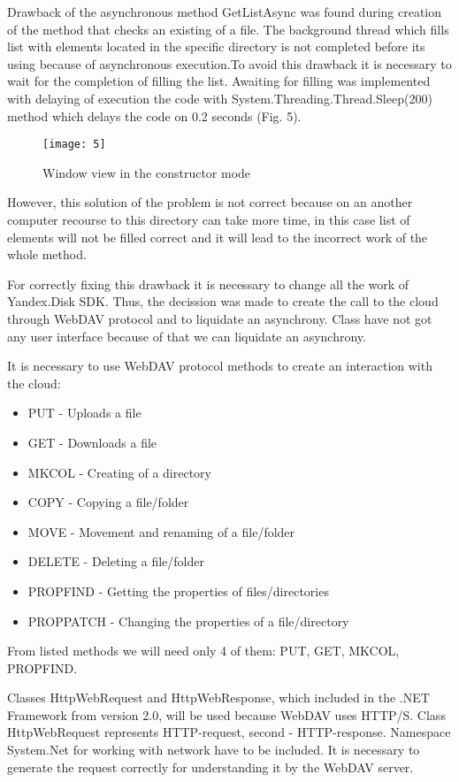 \documentclass[12pt,journal,compsoc]{D:/Магистратура/English/bare_conf/IEEEtran}
\begin{document}
Drawback of the asynchronous method GetListAsync was found during creation of the method that checks an existing of a file. The background thread which fills list with elements located in the specific directory is not completed before its using because of asynchronous execution.To avoid this drawback it is necessary to wait for the completion of filling the list. Awaiting for filling was implemented with delaying of execution the code with System.Threading.Thread.Sleep(200) method which delays the code on 0.2 seconds (Fig. 5).
\begin{figure}[h]
\centering
\texttt{[image: 5]}
\centering
\caption{Window view in the constructor mode}
\end{figure}

However, this solution of the problem is not correct because on an another computer recourse to this directory can take more time, in this case list of elements will not be filled correct and it will lead to the incorrect work of the whole method.

For correctly fixing this drawback it is necessary to change all the work of Yandex.Disk SDK. Thus, the decission was made to create the call to the cloud through WebDAV protocol and to liquidate an asynchrony. Class have not got any user interface because of that we can liquidate an asynchrony.

It is necessary to use WebDAV protocol methods to create an interaction with the cloud:
\begin{itemize}
\item PUT - Uploads a file
\item GET - Downloads a file
\item MKCOL - Creating of a directory
\item COPY - Copying a file/folder
\item MOVE - Movement and renaming of a file/folder
\item DELETE - Deleting a file/folder
\item PROPFIND - Getting the properties of files/directories
\item PROPPATCH - Changing the properties of a file/directory
\end{itemize}

From listed methods we will need only 4 of them: PUT, GET, MKCOL, PROPFIND.

Classes HttpWebRequest and HttpWebResponse, which included in the .NET Framework from version 2.0, will be used because WebDAV uses HTTP/S. Class HttpWebRequest represents HTTP-request, second - HTTP-response. Namespace System.Net for working with network have to be included. It is necessary to generate the request correctly for understanding it by the WebDAV server.
\end{document}
